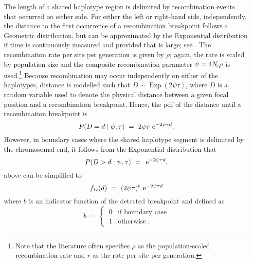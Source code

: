 The length of a shared haplotype region is delimited by  recombination events that occurred on either side.
For either the left or right-hand side, independently, the distance to the first occurrence of a recombination breakpoint follows a Geometric distribution, but can be approximated by the Exponential distribution if time is continuously measured and provided that \Ne is large; \eg see \citet{hein2004gene}.
The recombination rate per site per generation is given by $\rho$; again, the rate is scaled by population size and the composite recombination parameter ${\psi = 4 N_{\!e} \rho}$ is used.\footnote{Note that the literature often specifies $\rho$ as the population-scaled recombination rate and $r$ as the rate per site per generation.}
Because recombination may occur independently on either of the  haplotypes, distance is modelled such that ${D\sim\operatorname{Exp}(2\psi\tau)}$, where $D$ is a random variable used to denote the physical distance between a given focal position and a recombination breakpoint.
Hence, the \gls{pdf} of the distance until a recombination breakpoint is
\begin{equation}\label{eq:rec_prob_brk}
	P(D=d\mid\psi,\tau)~=~2\psi\tau \,\,\mathrm{e}^{-2\psi\tau d}\text{.}
\end{equation}
However, in boundary cases where the shared haplotype segment is delimited by the chromosomal end, it follows from the Exponential distribution that
\begin{equation}\label{eq:rec_prob_nobrk}
	P(D>d\mid\psi,\tau)~=~\,\mathrm{e}^{-2\psi\tau d}\text{.}
\end{equation}
 above can be simplified to
\begin{equation}\label{eq:rec_prob}
	f_D(d)~=~(2\psi\tau)^b \,\,\mathrm{e}^{-2\psi\tau d}
\end{equation}
where $b$ is an indicator function of the detected breakpoint and defined as
\begin{equation*}
	b ~=~
	\begin{cases}
    ~ 0 & \text{if boundary case} \\
    ~ 1 & \text{otherwise}\ .
  \end{cases}
\end{equation*}

